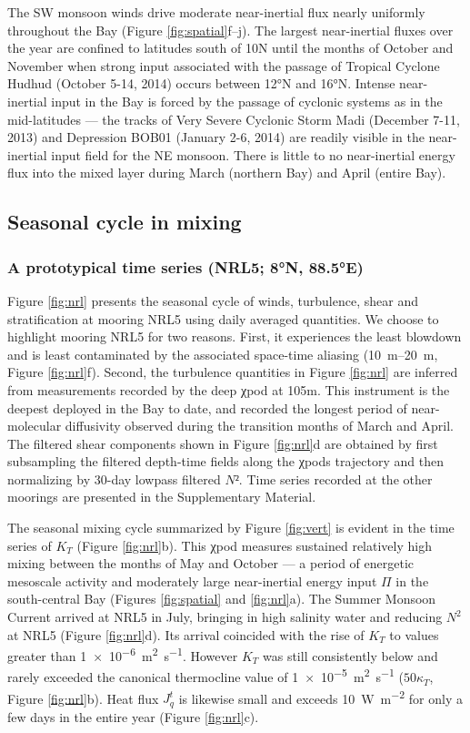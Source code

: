 \documentclass[twocol]{ametsoc}
\begin{document}
The SW monsoon winds drive moderate near-inertial flux nearly uniformly throughout the Bay (Figure \ref{fig:spatial}f--j).
The largest near-inertial fluxes over the year are confined to latitudes south of 10N until the months of October and November when strong input associated with the passage of Tropical Cyclone Hudhud (October 5-14, 2014) occurs between 12°N and 16°N.
Intense near-inertial input in the Bay is forced by the passage of cyclonic systems as in the mid-latitudes \citep{Alford2003} --- the tracks of Very Severe Cyclonic Storm Madi (December 7-11, 2013) and Depression BOB01 (January 2-6, 2014) are readily visible in the near-inertial input field for the NE monsoon.
There is little to no near-inertial energy flux into the mixed layer during March (northern Bay) and April (entire Bay).


\subsection{Seasonal cycle in mixing}
\label{sec:orgbcce381}
\subsubsection*{A prototypical time series (NRL5; 8°N, 88.5°E)}
\label{sec:org1c0c44b}
\label{sec:nrl}

Figure \ref{fig:nrl} presents the seasonal cycle of winds, turbulence, shear and stratification at mooring NRL5 using daily averaged quantities.
We choose to highlight mooring NRL5  for two reasons.
First, it experiences the least blowdown and is least contaminated by the associated space-time aliasing (\SIrange{10}{20}{\meter}, Figure \ref{fig:nrl}f).
Second, the turbulence quantities in Figure \ref{fig:nrl} are inferred from measurements recorded by the deep χpod at 105m.
This instrument is the deepest deployed in the Bay to date, and recorded the longest period of
near-molecular diffusivity observed during the transition months of March and April.
The filtered shear components shown in Figure \ref{fig:nrl}d are obtained by first subsampling the filtered depth-time fields along the χpods trajectory and then normalizing by 30-day lowpass filtered \(N²\).
Time series recorded at the other moorings are presented in the Supplementary Material.

The seasonal mixing cycle summarized by Figure \ref{fig:vert} is evident in the time series of \(K_T\) (Figure \ref{fig:nrl}b).
This χpod measures sustained relatively high mixing between the months of May and October --- a period of energetic mesoscale activity and moderately large near-inertial energy input \(Π\) in the south-central Bay (Figures \ref{fig:spatial} and \ref{fig:nrl}a).
The Summer Monsoon Current arrived at NRL5 in July, bringing in high salinity water and reducing \(N^2\) at NRL5 (Figure \ref{fig:nrl}d).
Its arrival coincided with the rise of \(K_T\) to values greater than \SI{1e-6}{\meter\squared\per\second}.
However \(K_T\) was still consistently below and rarely exceeded the canonical thermocline value of \SI{1e-5}{\m\squared\per\s} (\(50κ_T\), Figure \ref{fig:nrl}b).
Heat flux \(J_q^t\) is likewise small and exceeds \SI{10}{\W\per\m\squared} for only a few days in the entire year (Figure \ref{fig:nrl}c).
\end{document}
